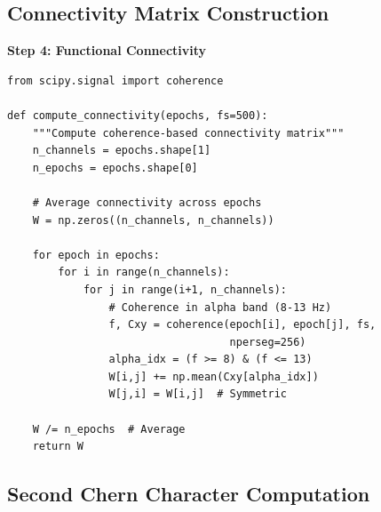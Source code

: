 \subsection{Connectivity Matrix Construction}

\textbf{Step 4: Functional Connectivity}
\begin{verbatim}
from scipy.signal import coherence

def compute_connectivity(epochs, fs=500):
    """Compute coherence-based connectivity matrix"""
    n_channels = epochs.shape[1]
    n_epochs = epochs.shape[0]

    # Average connectivity across epochs
    W = np.zeros((n_channels, n_channels))

    for epoch in epochs:
        for i in range(n_channels):
            for j in range(i+1, n_channels):
                # Coherence in alpha band (8-13 Hz)
                f, Cxy = coherence(epoch[i], epoch[j], fs,
                                   nperseg=256)
                alpha_idx = (f >= 8) & (f <= 13)
                W[i,j] += np.mean(Cxy[alpha_idx])
                W[j,i] = W[i,j]  # Symmetric

    W /= n_epochs  # Average
    return W
\end{verbatim}

\subsection{Second Chern Character Computation}
\label{sec:appC-ch2-computation}

